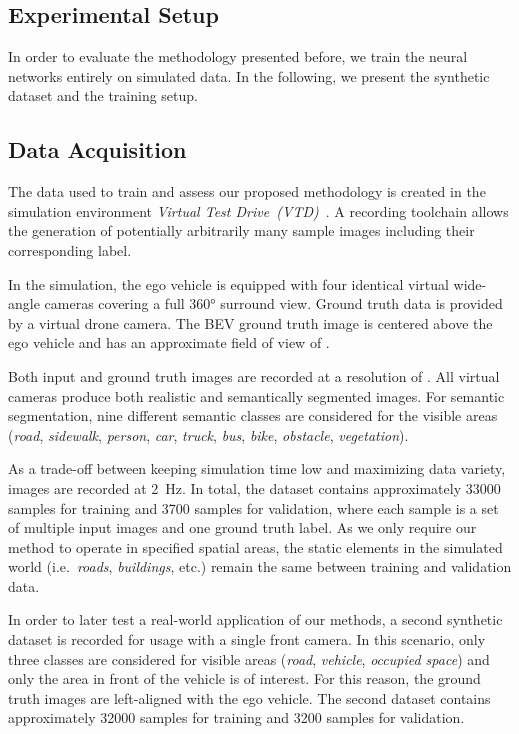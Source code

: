 \documentclass[a4paper, 10pt, conference]{ieeeconf}
\begin{document}
\begin{itemize}
\section{Experimental Setup}

In order to evaluate the methodology presented before, we train the neural networks entirely on simulated data. In the following, we present the synthetic dataset and the training setup.

\subsection{Data Acquisition}

The data used to train and assess our proposed methodology is created in the simulation environment \textit{Virtual Test Drive~(VTD)}~\cite{Neumann-CoselEtAl_VirtualTestDrive_2009}. A recording toolchain allows the generation of potentially arbitrarily many sample images including their corresponding label.

In the simulation, the ego vehicle is equipped with four identical virtual wide-angle cameras covering a full \ang{360} surround view. Ground truth data is provided by a virtual drone camera. The BEV ground truth image is centered above the ego vehicle and has an approximate field of view of . 

Both input and ground truth images are recorded at a resolution of . All virtual cameras produce both realistic and semantically segmented images. For semantic segmentation, nine different semantic classes are considered for the visible areas (\textit{road}, \textit{sidewalk}, \textit{person}, \textit{car}, \textit{truck}, \textit{bus}, \textit{bike}, \textit{obstacle}, \textit{vegetation}).

As a trade-off between keeping simulation time low and maximizing data variety, images are recorded at \SI{2}{Hz}. In total, the dataset contains approximately \num{33000} samples for training and \num{3700} samples for validation, where each sample is a set of multiple input images and one ground truth label. As we only require our method to operate in specified spatial areas, the static elements in the simulated world (i.e.\ \textit{roads}, \textit{buildings}, etc.) remain the same between training and validation data.

In order to later test a real-world application of our methods, a second synthetic dataset is recorded for usage with a single front camera. In this scenario, only three classes are considered for visible areas (\textit{road}, \textit{vehicle}, \textit{occupied space}) and only the area in front of the vehicle is of interest. For this reason, the ground truth images are left-aligned with the ego vehicle. The second dataset contains approximately \num{32000} samples for training and \num{3200} samples for validation.


\end{itemize}
\end{document}
